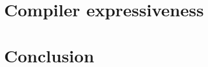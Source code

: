 \documentclass[a4paper,USenglish]{lipics}
\begin{document}
\section{\Java Compiler expressiveness}
\label{Section:compiler}


\section{Conclusion}
\label{Section:zz}


\small

\end{document}
